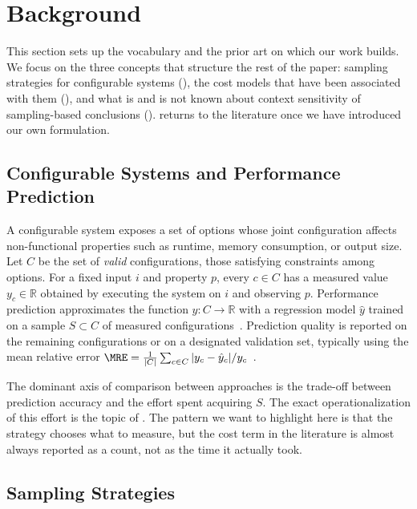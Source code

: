 \section{Background}
\label{sec:background}

This section sets up the vocabulary and the prior art on which our work
builds. We focus on the three concepts that structure the rest of the paper:
sampling strategies for configurable systems
(), the cost models that have been associated
with them (), and what is and is not known about
context sensitivity of sampling-based conclusions
().  returns to the
literature once we have introduced our own formulation.

\subsection{Configurable Systems and Performance Prediction}
\label{subsec:configurable-systems}

A configurable system exposes a set of options whose joint configuration affects
non-functional properties such as runtime, memory consumption, or output
size. Let $C$ be the set of \emph{valid} configurations, \ie those satisfying
constraints among options. For a fixed input $i$ and property $p$, every
$c\in C$ has a measured value $y_{c}\in\mathbb{R}$ obtained by executing the
system on $i$ and observing $p$. Performance prediction approximates the
function $y:C\to\mathbb{R}$ with a regression model $\hat y$ trained on a
sample $S\subset C$ of measured configurations~\cite{guo2013ASE,siegmund2015FSE,kaltenecker2019,julianasurvey}.
Prediction quality is reported on the remaining configurations or on a
designated validation set, typically using the mean relative error
$\MRE = \frac{1}{|C|}\sum_{c\in C}|y_{c}-\hat y_{c}|/y_{c}$~\cite{kaltenecker2019,pereira2020,julianasurvey}.

The dominant axis of comparison between approaches is the trade-off between
prediction accuracy and the effort spent acquiring $S$. The exact
operationalization of this effort is the topic of
. The pattern we want to highlight here is that
the strategy chooses what to measure, but the cost term in the literature is
almost always reported as a count, not as the time it actually took.

\subsection{Sampling Strategies}
\label{subsec:sampling-strategies}

